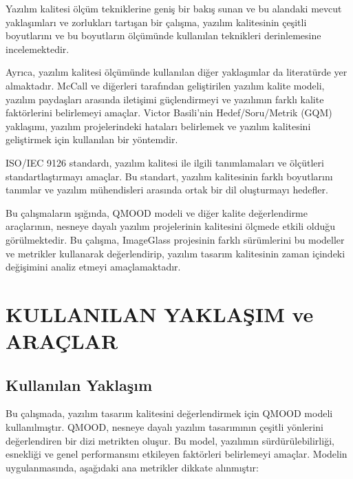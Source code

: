 \documentclass[conference]{IEEEtran}
\begin{document}
Yazılım kalitesi ölçüm tekniklerine geniş bir bakış sunan ve bu alandaki mevcut yaklaşımları ve zorlukları tartışan bir çalışma\cite{ozcevik}, yazılım kalitesinin çeşitli boyutlarını ve bu boyutların ölçümünde kullanılan teknikleri derinlemesine incelemektedir.

Ayrıca, yazılım kalitesi ölçümünde kullanılan diğer yaklaşımlar da literatürde yer almaktadır. McCall ve diğerleri\cite{mccall} tarafından geliştirilen yazılım kalite modeli, yazılım paydaşları arasında iletişimi güçlendirmeyi ve yazılımın farklı kalite faktörlerini belirlemeyi amaçlar. Victor Basili'nin Hedef/Soru/Metrik (GQM) yaklaşımı\cite{basili}, yazılım projelerindeki hataları belirlemek ve yazılım kalitesini geliştirmek için kullanılan bir yöntemdir.

ISO/IEC 9126 standardı\cite{isoiec9126}, yazılım kalitesi ile ilgili tanımlamaları ve ölçütleri standartlaştırmayı amaçlar. Bu standart, yazılım kalitesinin farklı boyutlarını tanımlar ve yazılım mühendisleri arasında ortak bir dil oluşturmayı hedefler.

Bu çalışmaların ışığında, QMOOD modeli ve diğer kalite değerlendirme araçlarının, nesneye dayalı yazılım projelerinin kalitesini ölçmede etkili olduğu görülmektedir. Bu çalışma, ImageGlass projesinin farklı sürümlerini bu modeller ve metrikler kullanarak değerlendirip, yazılım tasarım kalitesinin zaman içindeki değişimini analiz etmeyi amaçlamaktadır.

\section{KULLANILAN YAKLAŞIM ve ARAÇLAR}\label{sec:uc}

\subsection{Kullanılan Yaklaşım}
Bu çalışmada, yazılım tasarım kalitesini değerlendirmek için QMOOD modeli kullanılmıştır. QMOOD, nesneye dayalı yazılım tasarımının çeşitli yönlerini değerlendiren bir dizi metrikten oluşur. Bu model, yazılımın sürdürülebilirliği, esnekliği ve genel performansını etkileyen faktörleri belirlemeyi amaçlar. Modelin uygulanmasında, aşağıdaki ana metrikler dikkate alınmıştır:
\end{document}

